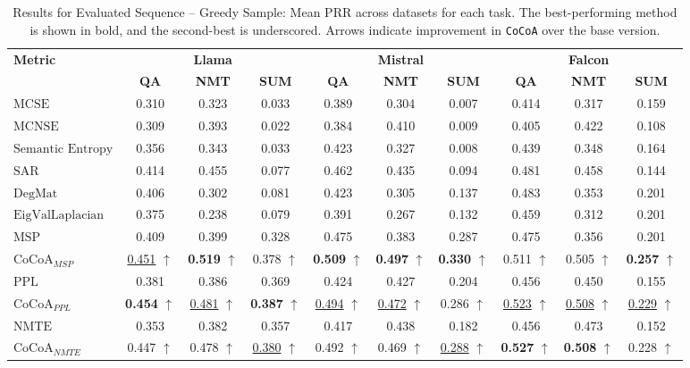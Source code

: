
    \begin{table*}[th!]
    \centering
    \renewcommand{\arraystretch}{1.2} %
    \begin{tabular}{lccccccccc}
    \bottomrule
    \textbf{Metric} & \multicolumn{3}{c}{\textbf{Llama}} & \multicolumn{3}{c}{\textbf{Mistral}} & \multicolumn{3}{c}{\textbf{Falcon}} \\  
    \cmidrule(lr){2-4} \cmidrule(lr){5-7} \cmidrule(lr){8-10}
    & \textbf{QA} & \textbf{NMT} & \textbf{SUM} 
    & \textbf{QA} & \textbf{NMT} & \textbf{SUM}  
    & \textbf{QA} & \textbf{NMT} & \textbf{SUM}  \\
    \midrule
    $\text{MCSE}$ & 0.310 & 0.323 & 0.033 & 0.389 & 0.304 & 0.007 & 0.414 & 0.317 & 0.159 \\
$\text{MCNSE}$ & 0.309 & 0.393 & 0.022 & 0.384 & 0.410 & 0.009 & 0.405 & 0.422 & 0.108 \\
$\text{Semantic Entropy}$ & 0.356 & 0.343 & 0.033 & 0.423 & 0.327 & 0.008 & 0.439 & 0.348 & 0.164 \\
$\text{SAR}$ & 0.414 & 0.455 & 0.077 & 0.462 & 0.435 & 0.094 & 0.481 & 0.458 & 0.144 \\
$\text{DegMat}$ & 0.406 & 0.302 & 0.081 & 0.423 & 0.305 & 0.137 & 0.483 & 0.353 & 0.201 \\
$\text{EigValLaplacian}$ & 0.375 & 0.238 & 0.079 & 0.391 & 0.267 & 0.132 & 0.459 & 0.312 & 0.201 \\ \midrule
$\text{MSP}$ & 0.409 & 0.399 & 0.328 & 0.475 & 0.383 & 0.287 & 0.475 & 0.356 & 0.201 \\
$\text{CoCoA}_{MSP}$ & \underline{0.451}  \(\uparrow\)   & \textbf{0.519}  \(\uparrow\)   & 0.378  \(\uparrow\)   & \textbf{0.509}  \(\uparrow\)   & \textbf{0.497}  \(\uparrow\)   & \textbf{0.330}  \(\uparrow\)   & 0.511  \(\uparrow\)   & 0.505  \(\uparrow\)   & \textbf{0.257}  \(\uparrow\)   \\ \midrule
$\text{PPL}$ & 0.381 & 0.386 & 0.369 & 0.424 & 0.427 & 0.204 & 0.456 & 0.450 & 0.155 \\
$\text{CoCoA}_{PPL}$ & \textbf{0.454}  \(\uparrow\)   & \underline{0.481}  \(\uparrow\)   & \textbf{0.387}  \(\uparrow\)   & \underline{0.494}  \(\uparrow\)   & \underline{0.472}  \(\uparrow\)   & 0.286  \(\uparrow\)   & \underline{0.523}  \(\uparrow\)   & \underline{0.508}  \(\uparrow\)   & \underline{0.229}  \(\uparrow\)   \\ \midrule
$\text{NMTE}$ & 0.353 & 0.382 & 0.357 & 0.417 & 0.438 & 0.182 & 0.456 & 0.473 & 0.152 \\
$\text{CoCoA}_{NMTE}$ & 0.447  \(\uparrow\)   & 0.478  \(\uparrow\)   & \underline{0.380}  \(\uparrow\)   & 0.492  \(\uparrow\)   & 0.469  \(\uparrow\)   & \underline{0.288}  \(\uparrow\)   & \textbf{0.527}  \(\uparrow\)   & \textbf{0.508}  \(\uparrow\)   & 0.228  \(\uparrow\)   \\
    \bottomrule
    \end{tabular}%
    \caption{Results for Evaluated Sequence -- Greedy Sample: Mean PRR across datasets for each task. The best-performing method is shown in bold, and the second-best is underscored. Arrows indicate improvement in \texttt{CoCoA} over the base version.}
    \label{tab:greedy_results}
    \end{table*}
